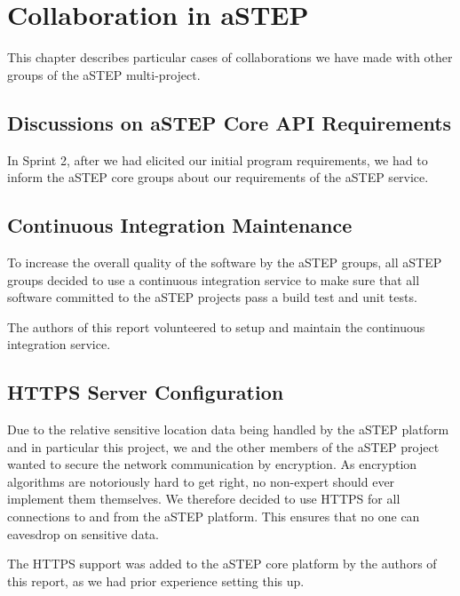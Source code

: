 \chapter{Collaboration in aSTEP}\label{ch:collab}

This chapter describes particular cases of collaborations we have made with other groups of the aSTEP multi-project.

\section{Discussions on aSTEP Core API Requirements}
In Sprint 2, after we had elicited our initial program requirements, we had to inform the aSTEP core groups about our requirements of the aSTEP service.

\section{Continuous Integration Maintenance}
To increase the overall quality of the software by the aSTEP groups, all aSTEP groups decided to use a continuous integration service to make sure that all software committed to the aSTEP projects pass a build test and unit tests.

The authors of this report volunteered to setup and maintain the continuous integration service.

\section{HTTPS Server Configuration}
Due to the relative sensitive location data being handled by the aSTEP platform and in particular this project, we and the other members of the aSTEP project wanted to secure the network communication by encryption. As encryption algorithms are notoriously hard to get right, no non-expert should ever implement them themselves. We therefore decided to use HTTPS for all connections to and from the aSTEP platform. This ensures that no one can eavesdrop on sensitive data.

The HTTPS support was added to the aSTEP core platform by the authors of this report, as we had prior experience setting this up.




